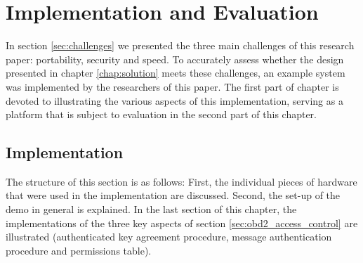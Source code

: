 
\chapter{Implementation and Evaluation}
\label{chap:implementation}

In section \ref{sec:challenges} we presented the three main challenges of this research paper: portability, security and speed. To accurately assess whether the design presented in chapter \ref{chap:solution} meets these challenges, an example system was implemented by the researchers of this paper. The first part of chapter is devoted to illustrating the various aspects of this implementation, serving as a platform that is subject to evaluation in the second part of this chapter. 

\section{Implementation}
The structure of this section is as follows: First, the individual pieces of hardware that were used in the implementation are discussed. Second, the set-up of the demo in general is explained. In the last section of this chapter, the implementations of the three key aspects of section \ref{sec:obd2_access_control} are illustrated (authenticated key agreement procedure, message authentication procedure and permissions table).

